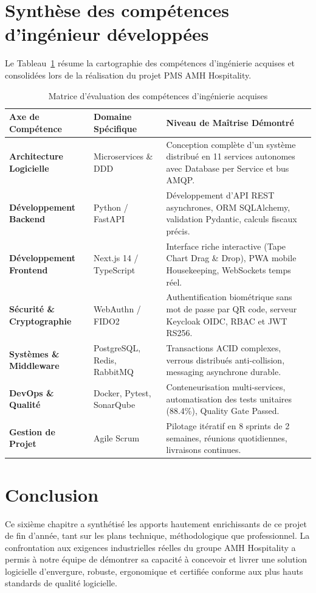 \section{Synthèse des compétences d'ingénieur développées}

Le Tableau~\ref{tab:competences_synthese} résume la cartographie des compétences d'ingénierie acquises et consolidées lors de la réalisation du projet PMS AMH Hospitality.

\begin{table}[H]
\centering
\small
\renewcommand{\arraystretch}{1.3}
\begin{tabularx}{\textwidth}{|p{4cm}|p{3.5cm}|X|}
\hline
\textbf{Axe de Compétence} & \textbf{Domaine Spécifique} & \textbf{Niveau de Maîtrise Démontré} \\
\hline
\textbf{Architecture Logicielle} & Microservices \& DDD & Conception complète d'un système distribué en 11 services autonomes avec Database per Service et bus AMQP. \\
\hline
\textbf{Développement Backend} & Python / FastAPI & Développement d'API REST asynchrones, ORM SQLAlchemy, validation Pydantic, calculs fiscaux précis. \\
\hline
\textbf{Développement Frontend} & Next.js 14 / TypeScript & Interface riche interactive (Tape Chart Drag \& Drop), PWA mobile Housekeeping, WebSockets temps réel. \\
\hline
\textbf{Sécurité \& Cryptographie} & WebAuthn / FIDO2 & Authentification biométrique sans mot de passe par QR code, serveur Keycloak OIDC, RBAC et JWT RS256. \\
\hline
\textbf{Systèmes \& Middleware} & PostgreSQL, Redis, RabbitMQ & Transactions ACID complexes, verrous distribués anti-collision, messaging asynchrone durable. \\
\hline
\textbf{DevOps \& Qualité} & Docker, Pytest, SonarQube & Conteneurisation multi-services, automatisation des tests unitaires (88.4\%), Quality Gate Passed. \\
\hline
\textbf{Gestion de Projet} & Agile Scrum & Pilotage itératif en 8 sprints de 2 semaines, réunions quotidiennes, livraisons continues. \\
\hline
\end{tabularx}
\caption{Matrice d'évaluation des compétences d'ingénierie acquises}
\label{tab:competences_synthese}
\end{table}

\section{Conclusion}

Ce sixième chapitre a synthétisé les apports hautement enrichissants de ce projet de fin d'année, tant sur les plans technique, méthodologique que professionnel. La confrontation aux exigences industrielles réelles du groupe AMH Hospitality a permis à notre équipe de démontrer sa capacité à concevoir et livrer une solution logicielle d'envergure, robuste, ergonomique et certifiée conforme aux plus hauts standards de qualité logicielle.
